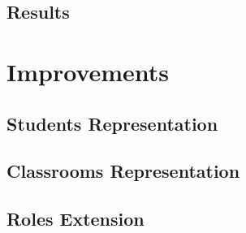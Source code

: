 \documentclass{beamer}
\begin{document}
\subsection{Results}


\section{Improvements}
\subsection{Students Representation}
\subsection{Classrooms Representation}
\subsection{Roles Extension}
\end{document}
